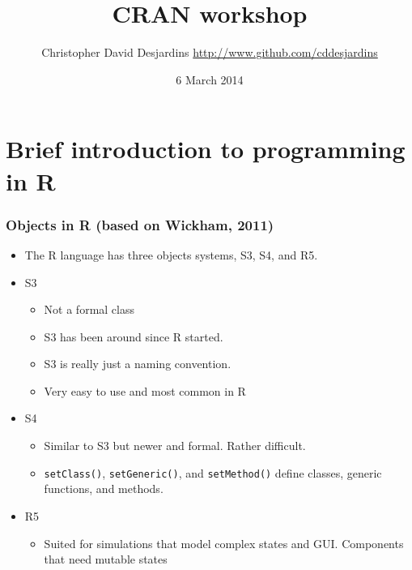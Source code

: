 \documentclass[xcolor=svgnames]{beamer}
\title{CRAN workshop}
\author{Christopher David Desjardins
\url{http://www.github.com/cddesjardins}}
\date{6 March 2014}
\begin{document}
\frame{\titlepage}
  

\section{Brief introduction to programming in R}


\begin{frame}
  \frametitle{Objects in R (based on Wickham, 2011)}
  \begin{itemize}
  \item The R language has three objects systems, S3, S4, and R5.
  \item S3
    \begin{itemize}
      \item Not a formal class
      \item S3 has been around since R started.
      \item S3 is really just a naming convention.
        \item Very easy to use and most common in R
   \end{itemize}
  \item S4
    \begin{itemize}
      \item Similar to S3 but newer and formal. Rather difficult.
        \item \texttt{setClass()}, \texttt{setGeneric()}, and \texttt{setMethod()} define classes, generic functions, and methods.
    \end{itemize}
    \item R5
      \begin{itemize}
        \item Suited for simulations that model complex states and GUI. Components that need mutable states
      \end{itemize}
  \end{itemize}
\end{frame}
\end{document}
